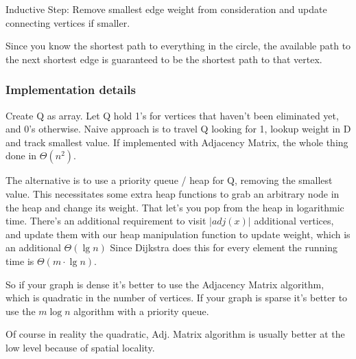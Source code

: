 \documentclass[english, 10pt]{article}
\begin{document}
Inductive Step: Remove smallest edge weight from consideration and update
connecting vertices if smaller.

Since you know the shortest path to everything in the circle, the available
path to the next shortest edge is guaranteed to be the shortest path to that
vertex.

\subsubsection{Implementation details}
Create Q as array. Let Q hold 1's for vertices that haven't been eliminated
yet, and 0's otherwise. Naive approach is to travel Q looking for 1, lookup
weight in D and track smallest value. If implemented with Adjacency Matrix, the
whole thing done in $\Theta(n^2)$.

The alternative is to use a priority queue / heap for Q, removing the smallest
value. This necessitates some extra heap functions to grab an arbitrary node in
the heap and change its weight. That let's you pop from the heap in logarithmic
time. There's an additional requirement to visit $|adj(x)|$ additional vertices,
and update them with our heap manipulation function to update weight, which is
an additional $\Theta(\lg n)$ Since Dijkstra does this for every element the
running time is $\Theta(m\cdot\lg n)$.

So if your graph is dense it's better to use the Adjacency Matrix algorithm,
which is quadratic in the number of vertices. If your graph is sparse it's
better to use the $m\log n$ algorithm with a priority queue.

Of course in reality the quadratic, Adj. Matrix algorithm is usually better at
the low level because of spatial locality.


\end{document}
